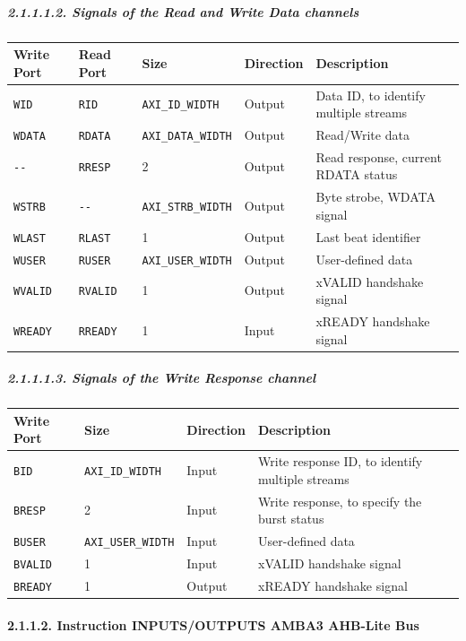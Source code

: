 \documentclass[]{article}
\let\oldparagraph\paragraph
\renewcommand{\paragraph}[1]{\oldparagraph{#1}\mbox{}}
\let\oldsubparagraph\subparagraph
\renewcommand{\subparagraph}[1]{\oldsubparagraph{#1}\mbox{}}
\begin{document}
\subparagraph{2.1.1.1.2. Signals of the Read and Write Data
channels}\label{signals-of-the-read-and-write-data-channels}

\begin{longtable}[]{@{}lllll@{}}
\toprule
Write Port & Read Port & Size & Direction & Description\tabularnewline
\midrule
\endhead
\texttt{WID} & \texttt{RID} & \texttt{AXI\_ID\_WIDTH} & Output & Data
ID, to identify multiple streams\tabularnewline
\texttt{WDATA} & \texttt{RDATA} & \texttt{AXI\_DATA\_WIDTH} & Output &
Read/Write data\tabularnewline
\texttt{-\/-} & \texttt{RRESP} & 2 & Output & Read response, current
RDATA status\tabularnewline
\texttt{WSTRB} & \texttt{-\/-} & \texttt{AXI\_STRB\_WIDTH} & Output &
Byte strobe, WDATA signal\tabularnewline
\texttt{WLAST} & \texttt{RLAST} & 1 & Output & Last beat
identifier\tabularnewline
\texttt{WUSER} & \texttt{RUSER} & \texttt{AXI\_USER\_WIDTH} & Output &
User-defined data\tabularnewline
\texttt{WVALID} & \texttt{RVALID} & 1 & Output & xVALID handshake
signal\tabularnewline
\texttt{WREADY} & \texttt{RREADY} & 1 & Input & xREADY handshake
signal\tabularnewline
\bottomrule
\end{longtable}

\subparagraph{2.1.1.1.3. Signals of the Write Response
channel}\label{signals-of-the-write-response-channel}

\begin{longtable}[]{@{}llll@{}}
\toprule
Write Port & Size & Direction & Description\tabularnewline
\midrule
\endhead
\texttt{BID} & \texttt{AXI\_ID\_WIDTH} & Input & Write response ID, to
identify multiple streams\tabularnewline
\texttt{BRESP} & 2 & Input & Write response, to specify the burst
status\tabularnewline
\texttt{BUSER} & \texttt{AXI\_USER\_WIDTH} & Input & User-defined
data\tabularnewline
\texttt{BVALID} & 1 & Input & xVALID handshake signal\tabularnewline
\texttt{BREADY} & 1 & Output & xREADY handshake signal\tabularnewline
\bottomrule
\end{longtable}

\paragraph{2.1.1.2. Instruction INPUTS/OUTPUTS AMBA3 AHB-Lite
Bus}\label{instruction-inputsoutputs-amba3-ahb-lite-bus}
\end{document}
